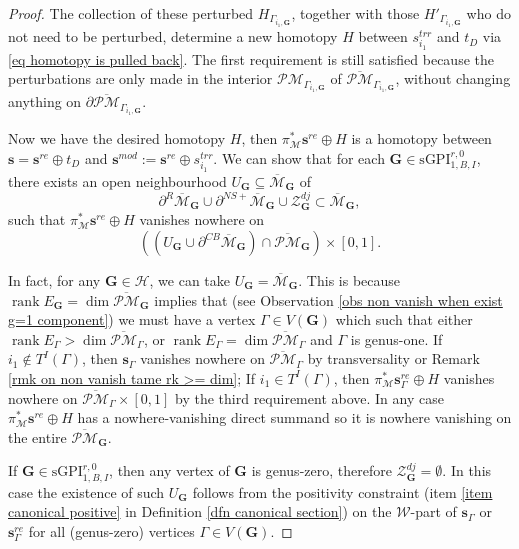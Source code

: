 \documentclass[11pt]{amsart}
\theoremstyle{definition}
\theoremstyle{remark}
\newcommand{\oPMb}{{\overline{\mathcal{PM}}}}
\newcommand{\nontilde}{}
\newcommand{\<}{\left<}
\renewcommand{\>}{\right>}
\numberwithin{equation}{section}
\DeclareMathOperator{\rk}{rank}
\def\Mbar{{\overline{\mathcal M}}}
\def\sGPI{\text{sGPI}}
\begin{document}
\begin{proof}
        The collection of these perturbed $H_{\Gamma_{i_1,\bm{G}}}$, together with those $H'_{\Gamma_{i_1,\bm{G}}}$ who do not need to be perturbed, determine  a new homotopy $H$ between $\nontilde{s}^{trr}_{i_1}$ and $t_D$ via \eqref{eq homotopy is pulled back}. The first requirement is still satisfied because the perturbations are only made in the interior  $\mathcal{PM}_{\Gamma_{i_1,\bm{G}}}$ of $\oPMb_{\Gamma_{i_1,\bm{G}}}$, without changing anything on $\partial\oPMb_{\Gamma_{i_1,\bm{G}}}$.

        Now we have the desired homotopy $H$, then $\pi^*_{\mathcal M} \bm{s}^{re}\oplus H$ is a homotopy between $\bm{s}=\bm{s}^{re}\oplus t_D$ and $\bm{s}^{mod}:=\bm{s}^{re} \oplus \nontilde{s}^{trr}_{i_1}$. 
        We can show that for each $\bm{G}\in \sGPI^{r,0}_{1,B,I}$, there exists an open neighbourhood $U_{\bm{G}}\subseteq \Mbar_{\bm{G}}$ of 
     $$\partial^{R}\Mbar_{\bm{G}}\cup \partial^{NS+}\Mbar_{\bm{G}}\cup \mathcal Z^{dj}_{\bm{G}}\subset \Mbar_{\bm{G}},$$ 
     such that $\pi^*_{\mathcal M} \bm{s}^{re}\oplus H$ vanishes nowhere on 
     $$
     \left((U_{\bm{G}} \cup \partial^{CB}\Mbar_{\bm{G}})\cap \oPMb_{\bm{G}}\right)\times [0,1].
     $$
     
     In fact, for any $\bm{G}\in \bm{\mathcal H}$, we can take $U_{\bm{G}}=\Mbar_{\bm{G}}$. This is because $\rk E_{\bm{G}}=\dim \oPMb_{\bm{G}}$ implies that (see Observation \ref{obs non vanish when exist g=1 component}) we must have %
a vertex %
$\Gamma\in V(\bm{G})$ which such that either $\rk E_{\Gamma}>\dim \oPMb_{\Gamma}$, or $\rk E_{\Gamma}=\dim \oPMb_{\Gamma}$ and $\Gamma$ is genus-one. If $i_1 \notin T^I(\Gamma)$, then $\bm{s}_{\Gamma}$ vanishes nowhere on $\oPMb_{\Gamma}$ by transversality or Remark \ref{rmk on non vanish tame rk >= dim};  If $i_1 \in T^I(\Gamma)$, then $\pi^*_{\mathcal M}\bm{s}^{re}_{\Gamma}\oplus H$ vanishes nowhere on $\oPMb_{\Gamma}\times [0,1]$ by the third requirement above. In any case $\pi^*_{\mathcal M} \bm{s}^{re}\oplus H$ has a nowhere-vanishing direct summand so it is nowhere vanishing on the entire $\oPMb_{\bm{G}}$.

     If $\bm{G}\in \sGPI_{1,B,I}^{r,0}$, then any vertex of $\bm{G}$ is genus-zero, therefore $\mathcal Z^{dj}_{\bm{G}}=\emptyset$. In this case the existence of such $U_{\bm{G}}$ follows from the positivity constraint (item \ref{item canonical positive} in Definition \ref{dfn canonical section}) on the $\mathcal{W}$-part of $\bm{s}_{\Gamma}$ or $\bm{s}^{re}_{\Gamma}$ for all (genus-zero) vertices $\Gamma\in V(\bm{G})$.


\end{proof}
\end{document}
